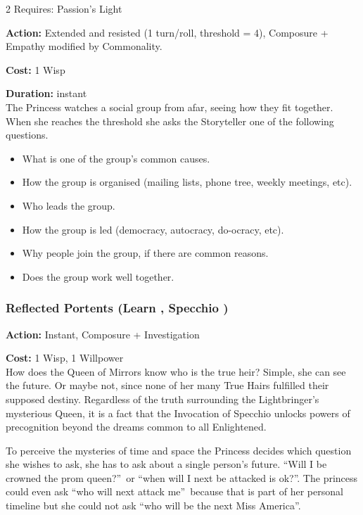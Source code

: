 \begin{multicols}{2}
\noindent Requires: Passion's Light

\noindent \textbf{Action:} Extended and resisted (1 turn/roll, threshold = 4), Composure + Empathy modified by Commonality.

\noindent \textbf{Cost:} 1 Wisp

\noindent \textbf{Duration:} instant \\

\noindent The Princess watches a social group from afar, seeing how they fit together. When she reaches the threshold she asks the Storyteller one of the following questions. 

    \begin{itemize}\item What is one of the group's common causes.
    \item How the group is organised (mailing lists, phone tree, weekly meetings, etc).
    \item Who leads the group. 
    \item How the group is led (democracy, autocracy, do-ocracy, etc).
    \item Why people join the group, if there are common reasons.
    \item Does the group work well together.
    \end{itemize}

\subsubsection*{Reflected Portents (Learn \textbullet\textbullet\textbullet, Specchio \textbullet\textbullet\textbullet)}

\noindent \textbf{Action:} Instant, Composure + Investigation

\noindent \textbf{Cost:} 1 Wisp, 1 Willpower \\

\noindent How does the Queen of Mirrors know who is the true heir? Simple, she can see the future. Or maybe not, since none of her many True Hairs fulfilled their supposed destiny. Regardless of the truth surrounding the Lightbringer's mysterious Queen, it is a fact that the Invocation of Specchio unlocks powers of precognition beyond the dreams common to all Enlightened.

To perceive the mysteries of time and space the Princess decides which question she wishes to ask, she has to ask about a single person's future. \textquotedblleft Will I be crowned the prom queen?\textquotedblright\, or \textquotedblleft when will I next be attacked is ok?\textquotedblright. The princess could even ask \textquotedblleft who will next attack me\textquotedblright\, because that is part of her personal timeline but she could not ask \textquotedblleft who will be the next Miss America\textquotedblright.


\end{multicols}
